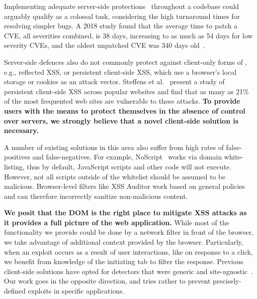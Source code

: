 Implementing adequate server-side protections~\cite{Xu:2006:TPE:1267336.1267345,DBLP:conf/sec/Nguyen-TuongGGSE05,Pietraszek:2005:DAI:2146257.2146267,Bisht:2008:XPD:1428322.1428325} throughout a codebase could arguably qualify as a colossal task, considering the high turnaround times for resolving simpler bugs. A 2018 study found that the average time to patch a \ac{CVE}, all severities combined, is 38 days, increasing to as much as 54 days for low severity CVEs, and the oldest unpatched \ac{CVE} was 340 days old~\cite{Rapid7}.



Server-side defences also do not commonly protect against client-only forms of
\xss, e.g., reflected \ac{XSS}, or persistent
client-side \ac{XSS}, which use a browser's local storage or cookies
as an attack vector. Steffens et
al.~\cite{DBLP:conf/ndss/SteffensRJS19} present a study of persistent
client-side \ac{XSS} across popular websites and find that as many as
21\% of the most frequented web sites are vulnerable to these attacks.
%
\textbf{To provide users with the means to protect themselves in the absence
of control over servers, we strongly believe that a novel client-side
solution is necessary.}

A number of existing solutions in this area also suffer from high
rates of false-positives and false-negatives. %
For example, NoScript~\cite{Noscript} works via domain white-listing, thus by
default, JavaScript scripts and other code will not execute. However,
not all scripts outside of the whitelist should be assumed to be
malicious. Browser-level filters like XSS Auditor work based on
general policies and can therefore incorrectly sanitize non-malicious
content.

\textbf{We posit that the DOM is the right place to mitigate XSS
  attacks as it provides a full picture of the web application.} While
most of the functionality we provide could be done by a network filter
in front of the browser, we take advantage of additional context
provided by the browser.
%
Particularly, when an exploit occurs as a result of user interactions,
like on response to a click, we
benefit from knowledge of the initiating tab to filter the
response. Previous client-side solutions have opted for detectors that were generic and site-agnostic~\cite{Kirda:2009:CCS:2639535.2639808,Jim:2007:DSI:1242572.1242654,Hallaraker:2005:DMJ:1078029.1078861}. Our work goes in the opposite direction, and tries rather to prevent precisely-defined exploits in specific applications. 

